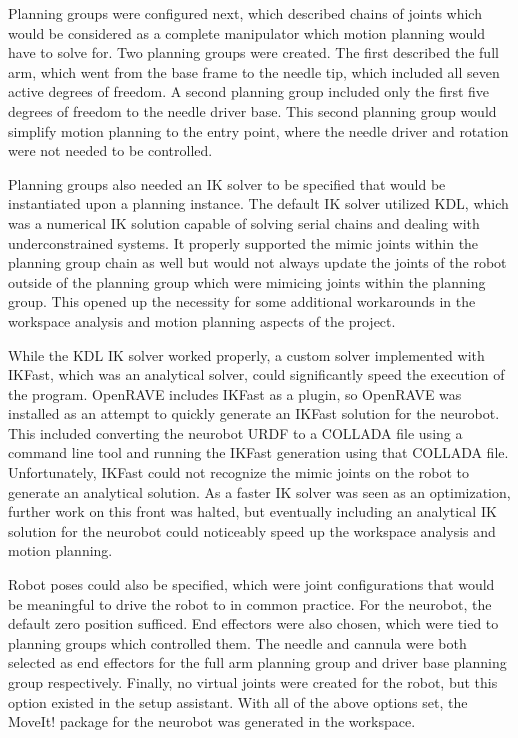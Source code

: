 \documentclass[12pt]{report}
\begin{document}
Planning groups were configured next, which described chains of joints which would be considered as a complete manipulator which motion planning would have to solve for. Two planning groups were created. The first described the full arm, which went from the base frame to the needle tip, which included all seven active degrees of freedom. A second planning group included only the first five degrees of freedom to the needle driver base. This second planning group would simplify motion planning to the entry point, where the needle driver and rotation were not needed to be controlled. 

Planning groups also needed an IK solver to be specified that would be instantiated upon a planning instance. The default IK solver utilized KDL, which was a numerical IK solution capable of solving serial chains and dealing with underconstrained systems. It properly supported the mimic joints within the planning group chain as well but would not always update the joints of the robot outside of the planning group which were mimicing joints within the planning group. This opened up the necessity for some additional workarounds in the workspace analysis and motion planning aspects of the project. 

While the KDL IK solver worked properly, a custom solver implemented with IKFast, which was an analytical solver, could significantly speed the execution of the program. \cite{ikFastMoveIt} OpenRAVE includes IKFast as a plugin, so OpenRAVE was installed as an attempt to quickly generate an IKFast solution for the neurobot. This included converting the neurobot URDF to a COLLADA file using a command line tool and running the IKFast generation using that COLLADA file. Unfortunately, IKFast could not recognize the mimic joints on the robot to generate an analytical solution. As a faster IK solver was seen as an optimization, further work on this front was halted, but eventually including an analytical IK solution for the neurobot could noticeably speed up the workspace analysis and motion planning.

Robot poses could also be specified, which were joint configurations that would be meaningful to drive the robot to in common practice. For the neurobot, the default zero position sufficed. End effectors were also chosen, which were tied to planning groups which controlled them. The needle and cannula were both selected as end effectors for the full arm planning group and driver base planning group respectively. Finally, no virtual joints were created for the robot, but this option existed in the setup assistant. With all of the above options set, the MoveIt! package for the neurobot was generated in the workspace.
\end{document}
